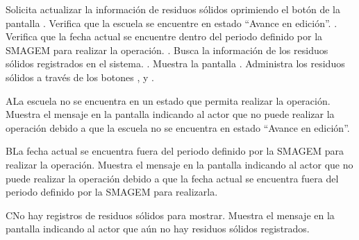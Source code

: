  \begin{UCtrayectoria}
    \UCpaso[\UCactor] Solicita actualizar la información de residuos sólidos oprimiendo el botón  de la pantalla .
    \UCpaso[\UCsist] Verifica que la escuela se encuentre en estado ``Avance en edición''. .
    \UCpaso[\UCsist] Verifica que la fecha actual se encuentre dentro del periodo definido por la SMAGEM para realizar la operación. .
    \UCpaso[\UCsist] Busca la información de los residuos sólidos registrados en el sistema. .
    \UCpaso[\UCsist] Muestra la pantalla .
    \UCpaso[\UCactor] Administra los residuos sólidos a través de los botones , \botEdit y \botKo  . \label{cus29:Registrar}
 \end{UCtrayectoria}
 

      \begin{UCtrayectoriaA}{A}{La escuela no se encuentra en un estado que permita realizar la operación.}
	\UCpaso[\UCsist] Muestra el mensaje  en la pantalla  indicando al actor que no puede realizar la operación debido a que la escuela no se encuentra en estado ``Avance en edición''. 
    \end{UCtrayectoriaA}
 
 \begin{UCtrayectoriaA}{B}{La fecha actual se encuentra fuera del periodo definido por la SMAGEM para realizar la operación.}
    \UCpaso[\UCsist] Muestra el mensaje  en la pantalla  indicando al actor que no puede realizar la operación debido a que la fecha actual se encuentra fuera del periodo definido por la SMAGEM para realizarla. 
 \end{UCtrayectoriaA}
 
  \begin{UCtrayectoriaA}{C}{No hay registros de residuos sólidos para mostrar.}
    \UCpaso[\UCsist] Muestra el mensaje  en la pantalla  indicando al actor que aún no hay residuos sólidos registrados. 
 \end{UCtrayectoriaA}


